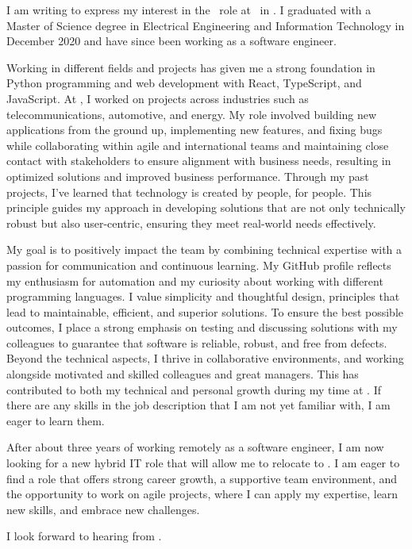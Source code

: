 I am writing to express my interest in the \ROLE\ role at \COMPANY\ in \CITY. I graduated with a Master of Science degree in Electrical Engineering and Information Technology in December 2020 and have since been working as a software engineer.

Working in different fields and projects has given me a strong foundation in Python programming and web development with React, TypeScript, and JavaScript. At \companyNow, I worked on projects across industries such as telecommunications, automotive, and energy. My role involved building new applications from the ground up, implementing new features, and fixing bugs while collaborating within agile and international teams and maintaining close contact with stakeholders to ensure alignment with business needs, resulting in optimized solutions and improved business performance. 
Through my past projects, I’ve learned that technology is created by people, for people. This principle guides my approach in developing solutions that are not only technically robust but also user-centric, ensuring they meet real-world needs effectively.


My goal is to positively impact the team by combining technical expertise with a passion for communication and continuous learning. My GitHub profile reflects my enthusiasm for automation and my curiosity about working with different programming languages. I value simplicity and thoughtful design, principles that lead to maintainable, efficient, and superior solutions. To ensure the best possible outcomes, I place a strong emphasis on testing and discussing solutions with my colleagues to guarantee that software is reliable, robust, and free from defects. Beyond the technical aspects, I thrive in collaborative environments, and working alongside motivated and skilled colleagues and great managers. This has contributed to both my technical and personal growth during my time at \companyNow. If there are any skills in the job description that I am not yet familiar with, I am eager to learn them.

After about three years of working remotely as a software engineer, I am now looking for a new hybrid IT role that will allow me to relocate to \CITY. I am eager to find a role that offers strong career growth, a supportive team environment, and the opportunity to work on agile projects, where I can apply my expertise, learn new skills, and embrace new challenges.

I look forward to hearing from \COMPANY.